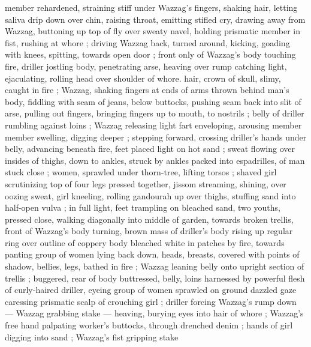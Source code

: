 member rehardened, straining stiff under Wazzag's fingers, shaking hair, letting saliva drip down over chin, raising throat, emitting stifled cry, drawing away from Wazzag, buttoning up top of fly over sweaty navel, holding prismatic member in fist, rushing at whore ; driving Wazzag back, turned around, kicking, goading with knees, spitting, towards open door ; front only of Wazzag's body touching fire, driller jostling body, penetrating arse, heaving over rump catching light, ejaculating, rolling head over shoulder of whore. hair, crown of skull, slimy, caught in fire ; Wazzag, shaking fingers at ends of arms thrown behind man's body, fiddling with seam of jeans, below buttocks, pushing seam back into slit of arse, pulling out fingers, bringing fingers up to mouth, to nostrils ; belly of driller rumbling against loins ; Wazzag releasing light fart enveloping, arousing member {\col} member swelling, digging deeper ; stepping forward, crossing driller's hands under belly, advancing beneath fire, feet placed light on hot sand ; sweat flowing over insides of thighs, down to ankles, struck by ankles packed into espadrilles, of man stuck close ; women, sprawled under thorn-tree, lifting torsos ; shaved girl scrutinizing top of four legs pressed together, jissom streaming, shining, over oozing sweat, girl kneeling, rolling gandourah up over thighs, stuffing sand into half-open vulva ; in full light, feet trampling on bleached sand, two youths, pressed close, walking diagonally into middle of garden, towards broken trellis, front of Wazzag's body turning, brown mass of driller's body rising up regular ring over outline of coppery body bleached white in patches by fire, towards panting group of women lying back down, heads, breasts, covered with points of shadow, bellies, legs, bathed in fire ; Wazzag leaning belly onto upright section of trellis ; buggered, rear of body buttressed, belly, loins harnessed by powerful flesh of curly-haired driller, eyeing group of women sprawled on ground {\col} dazzled gaze caressing prismatic scalp of crouching girl ; driller forcing Wazzag's rump down --- Wazzag grabbing stake --- heaving, burying eyes into hair of whore ; Wazzag's free hand palpating worker's buttocks, through drenched denim ; hands of girl digging into sand ; Wazzag's fist gripping stake 
